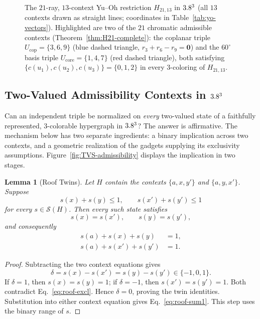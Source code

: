 \documentclass[aps,pra,reprint,superscriptaddress,longbibliography,nofootinbib,floatfix,10pt]{revtex4-2}
\newtheorem{lemma}[theorem]{Lemma}
\theoremstyle{definition}\newtheorem{definition}[theorem]{Definition}
\theoremstyle{remark}\newtheorem{remark}[theorem]{Remark}
\newcommand{\Sc}{\mathcal S}\newcommand{\Cc}{\mathcal C}\newcommand{\Wc}{\mathcal W}
\begin{document}
\begin{figure}[!htbp]
\caption{The $21$-ray, $13$-context Yu--Oh restriction $H_{21,13}$ in $3.8^3$ (all $13$ contexts drawn as straight lines; coordinates in Table~\ref{tab:yo-vectors}). Highlighted are two of the $21$ chromatic admissible contexts (Theorem~\ref{thm:H21-complete}): the coplanar triple $U_{\mathrm{cop}}=\{3,6,9\}$ (blue dashed triangle, $r_3+r_6-r_9=\mathbf{0}$) and the $60^\circ$ basis triple $U_{\mathrm{core}}=\{1,4,7\}$ (red dashed triangle), both satisfying $\{c(u_1),c(u_2),c(u_3)\}=\{0,1,2\}$ in every $3$-coloring of $H_{21,13}$.}\label{fig:H21-admissibility}
\end{figure}

\subsection{Two-Valued Admissibility Contexts in \texorpdfstring{$3.8^3$}{R3}}\label{sec:tvs-admissibility}

Can an independent triple be normalized on \emph{every} two-valued state of a faithfully represented, $3$-colorable hypergraph in $3.8^3$? The answer is affirmative. The mechanism below has two separate ingredients: a binary implication across two contexts, and a geometric realization of the gadgets supplying its exclusivity assumptions. Figure~\ref{fig:TVS-admissibility} displays the implication in two stages.

\begin{lemma}[Roof Twins]\label{lem:roof-twin}
Let $H$ contain the contexts $\{a,x,y'\}$ and $\{a,y,x'\}$. Suppose
\begin{equation}\label{eq:roof-excl}
s(x)+s(y)\le1,\qquad s(x')+s(y')\le1
\end{equation}
for every $s\in\Sc(H)$. Then every such state satisfies
\begin{equation}\label{eq:roof-twins}
s(x)=s(x'),\qquad s(y)=s(y'),
\end{equation}
and consequently
\begin{equation}\label{eq:roof-sum1}
\begin{aligned}
s(a)+s(x)+s(y)&=1,\\
s(a)+s(x')+s(y')&=1.
\end{aligned}
\end{equation}
\end{lemma}
\begin{proof}
Subtracting the two context equations gives
\[
\delta=s(x)-s(x')=s(y)-s(y')\in\{-1,0,1\}.
\]
If $\delta=1$, then $s(x)=s(y)=1$; if $\delta=-1$, then $s(x')=s(y')=1$. Both contradict Eq.~\eqref{eq:roof-excl}. Hence $\delta=0$, proving the twin identities. Substitution into either context equation gives Eq.~\eqref{eq:roof-sum1}. This step uses the binary range of $s$.
\end{proof}
\end{document}

